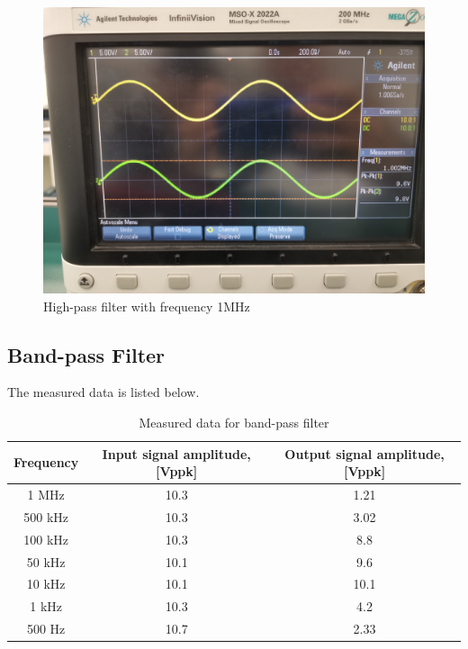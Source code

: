 \documentclass{article}
\begin{document}
  \begin{figure}[H]
  \centering
  \includegraphics[width=.6\textwidth]{Figure10.jpg}
  \caption{High-pass filter with frequency 1MHz}
  \label{img} 
\end{figure}

\subsection{Band-pass Filter}
The measured data is listed below.
\begin{table}[H]
\centering
\begin{tabular}{|c|c|c|}
\hline
Frequency & Input signal amplitude, {[}Vppk{]} & Output signal amplitude, {[}Vppk{]} \\ \hline
1 MHz     & 10.3                               & 1.21                                \\ \hline
500 kHz   & 10.3                               & 3.02                                \\ \hline
100 kHz   & 10.3                               & 8.8                                 \\ \hline
50 kHz    & 10.1                               & 9.6                                 \\ \hline
10 kHz    & 10.1                               & 10.1                                \\ \hline
1 kHz     & 10.3                               & 4.2                                 \\ \hline
500 Hz    & 10.7                               & 2.33                                \\ \hline
\end{tabular}
\caption{Measured data for band-pass filter}
\end{table}
\end{document}
